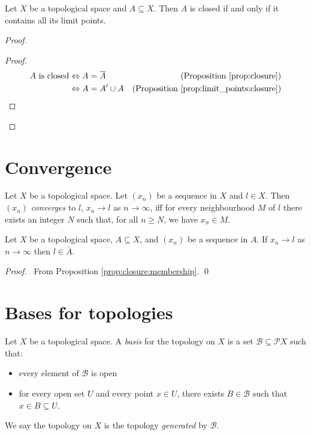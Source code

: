 \begin{cor}
  Let $X$ be a topological space and $A \subseteq X$. Then $A$ is closed if and only if it contains all its limit points.
\end{cor}

\begin{proof}
  \pf
  \begin{proof}
    \pf
    \begin{align*}
      A \text{ is closed} & \Leftrightarrow A = \overline{A} & (\text{Proposition \ref{prop:closure}}) \\
      & \Leftrightarrow A = A' \cup A & (\text{Proposition \ref{prop:limit_points:closure}})
    \end{align*}
  \end{proof}
\end{proof}

\section{Convergence}

\begin{df}[Convergence]
  Let $X$ be a topological space. Let $(x_n)$ be a sequence in $X$ and $l \in X$. Then $(x_n)$ \emph{converges} to $l$, $x_n \rightarrow l$ as $n \rightarrow \infty$,
  iff for every neighbourhood $M$ of $l$ there exists an integer $N$ such that, for all $n \geq N$, we have $x_n \in M$.
\end{df}

\begin{prop}
  Let $X$ be a topological space, $A \subseteq X$, and $(x_n)$ be a sequence in $A$. If $x_n \rightarrow l$ as $n \rightarrow \infty$ then $l \in \overline{A}$.
\end{prop}

\begin{proof}
  \pf\ From Proposition \ref{prop:closure:membership}. \qed
\end{proof}

\section{Bases for topologies}

\begin{df}[Basis]
Let $X$ be a topological space. A \emph{basis} for the topology on $X$ is a set $\mathcal{B} \subseteq \mathcal{P} X$ such that:
\begin{itemize}
\item every element of $\mathcal{B}$ is open
\item for every open set $U$ and every point $x \in U$, there exists $B \in \mathcal{B}$ such that $x \in B \subseteq U$.
\end{itemize}
We say the topology on $X$ is the topology \emph{generated} by $\mathcal{B}$.
\end{df}

